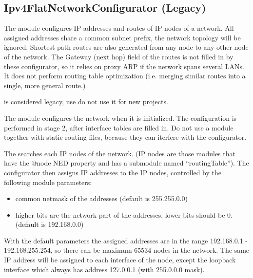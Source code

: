 \subsection{Ipv4FlatNetworkConfigurator (Legacy)}
\label{sec:autoconfig:ipv4flatnetworkconfigurator}

The  module configures
IP addresses and routes of IP nodes of a network.
All assigned addresses share a common subnet prefix,
the network topology will be ignored. Shortest path
routes are also generated from any node to any other
node of the network. The Gateway (next hop) field of the routes
is not filled in by these configurator, so it relies
on proxy ARP if the network spans several LANs.
It does not perform routing table optimization (i.e.
merging similar routes into a single, more general route.)

\begin{warning}
 is considered
legacy, use do not use it for new projects.
\end{warning}

The  module configures
the network when it is initialized. The configuration
is performed in stage 2, after interface tables are
filled in. Do not use a 
module together with static routing files, because they
can iterfere with the configurator.

The  searches each IP nodes of the network.
(IP nodes are those modules that have the @node NED property and
has a  submodule named ``routingTable'').
The configurator then assigns IP addresses to the IP nodes, controlled
by the following module parameters:
\begin{itemize}
  \item {} common netmask of the addresses (default is 255.255.0.0)
  \item {} higher bits are the network part of the addresses,
        lower bits should be 0. (default is 192.168.0.0)
\end{itemize}

With the default parameters the assigned addresses are in the range
192.168.0.1 - 192.168.255.254, so there can be maximum 65534 nodes in the
network. The same IP address will be assigned to each interface
of the node, except the loopback interface which always has address 127.0.0.1
(with 255.0.0.0 mask).

